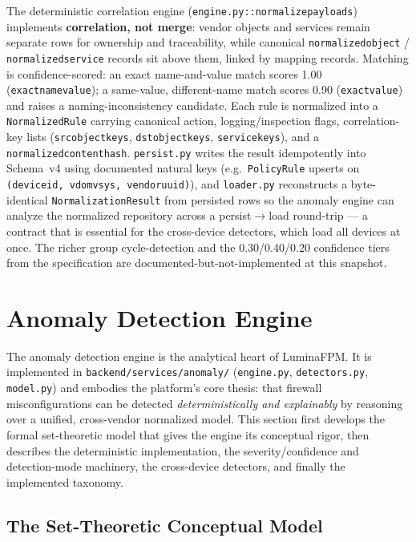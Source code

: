 \documentclass[12pt,a4paper]{report}
\renewcommand{\_}{\textunderscore\allowbreak}
\begin{document}
The deterministic correlation engine (\texttt{engine.py::normalize\_payloads}) implements \textbf{correlation, not merge}: vendor objects and services remain separate rows for ownership and traceability, while canonical \texttt{normalized\_object} / \texttt{normalized\_service} records sit above them, linked by mapping records. Matching is confidence-scored: an exact name-and-value match scores 1.00 (\texttt{exact\_name\_value}); a same-value, different-name match scores 0.90 (\texttt{exact\_value}) and raises a naming-inconsistency candidate. Each rule is normalized into a \texttt{NormalizedRule} carrying canonical action, logging/inspection flags, correlation-key lists (\texttt{src\_object\_keys}, \texttt{dst\_object\_keys}, \texttt{service\_keys}), and a \texttt{normalized\_content\_hash}. \texttt{persist.py} writes the result idempotently into Schema~v4 using documented natural keys (e.g.\ \texttt{PolicyRule} upserts on \texttt{(device\_id,\,vdom\_vsys,\,vendor\_uuid)}), and \texttt{loader.py} reconstructs a byte-identical \texttt{NormalizationResult} from persisted rows so the anomaly engine can analyze the normalized repository across a persist$\rightarrow$load round-trip --- a contract that is essential for the cross-device detectors, which load all devices at once. The richer group cycle-detection and the 0.30/0.40/0.20 confidence tiers from the specification are documented-but-not-implemented at this snapshot.

\section{Anomaly Detection Engine}
\label{sec:ch4-anomaly}

The anomaly detection engine is the analytical heart of LuminaFPM. It is implemented in \texttt{backend/services/anomaly/} (\texttt{engine.py}, \texttt{detectors.py}, \texttt{model.py}) and embodies the platform's core thesis: that firewall misconfigurations can be detected \emph{deterministically and explainably} by reasoning over a unified, cross-vendor normalized model. This section first develops the formal set-theoretic model that gives the engine its conceptual rigor, then describes the deterministic implementation, the severity/confidence and detection-mode machinery, the cross-device detectors, and finally the implemented taxonomy.

\subsection{The Set-Theoretic Conceptual Model}
\label{sec:ch4-settheory}
\end{document}
